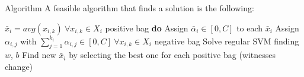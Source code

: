 \begin{frame}{Algorithm}
	A feasible algorithm that finds a solution is the following:
	
	\begin{codebox}
		\li $\bar{x}_i = avg(x_{i,k}) \ \forall x_{i,k} \in X_i$ positive bag
		\li \textbf{do} \Do
		\li Assign $\bar{\alpha}_i \in [0,C]$ to each $\bar{x}_i$
		\li Assign $\alpha_{i,j}$ with $\sum_{j=1}^{k_i}\alpha_{i,j} \in [0,C] \ \forall x_{i,k} \in X_i$ negative bag
		\li Solve regular SVM finding $w$, $b$
		\li Find new $\bar{x}_i$ by selecting the best one for each positive bag \End
		\li \While(witnesses change)
		
	\end{codebox}
	
\end{frame}

